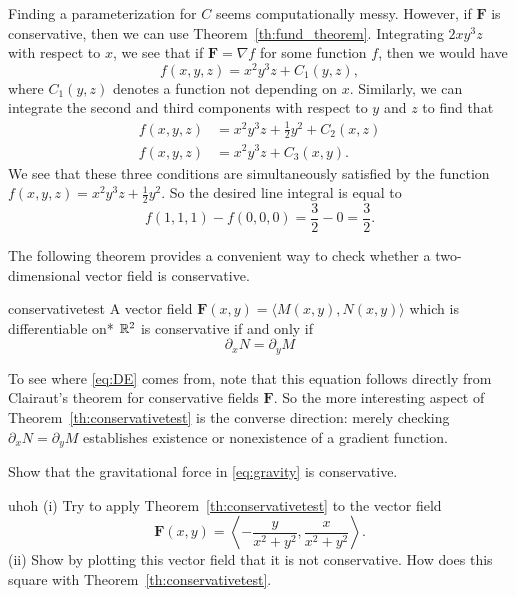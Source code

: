 \documentclass{watsonbook}
\begin{document}
\begin{solution}
  Finding a parameterization for $C$ seems computationally messy.
  However, if $\mathbf{F}$ is conservative, then we can use
  Theorem~\ref{th:fund_theorem}. Integrating $2  x y^{3} z$ with
  respect to $x$, we see that if $\mathbf{F} = \nabla f$ for some
  function $f$, then we would have 
  \[
    f(x,y,z) = x^2 y^3 z + C_1(y,z), 
  \]
  where $C_1(y,z)$ denotes a function not depending on $x$. Similarly,
  we can integrate the second and third components with respect to $y$
  and $z$ to find that
  \begin{align*}
    f(x,y,z) &= x^2 y^3 z + \frac{1}{2}y^2 + C_2(x,z) \\
    f(x,y,z) &= x^2 y^3 z + C_3(x,y). 
  \end{align*}
  We see that these three conditions are simultaneously satisfied by
  the function $f(x,y,z) = x^2 y^3 z + \tfrac{1}{2}y^2$. So the
  desired line integral is equal to 
  \[
    f(1,1,1) - f(0,0,0) = \frac{3}{2} - 0  = \boxed{\frac{3}{2}}. 
  \]
\end{solution}

The following theorem provides a convenient way to check whether a
two-dimensional vector field is conservative. 

\begin{theo}{}{conservativetest}
  A vector field $\mathbf{F}(x,y) = \langle M(x,y), N(x,y)\rangle$
  which is differentiable on*  $\mathbb{R}^2$ is
  conservative if and only if
  \begin{equation} \label{eq:DE}
    \partial_x N = \partial_y M
  \end{equation}
\end{theo}
To see where \eqref{eq:DE} comes from, note that this equation follows directly
from Clairaut's theorem for conservative fields $\mathbf{F}$. 
So the more interesting aspect of Theorem~\ref{th:conservativetest} is
the converse direction: merely checking $\partial_x N = \partial_y M$
establishes existence or nonexistence of a gradient function. 

\begin{exercise}{}{}
  Show that the gravitational force in \eqref{eq:gravity} is
  conservative.
\end{exercise}

\begin{exercise}{}{uhoh}
  (i) Try to apply Theorem~\ref{th:conservativetest}  to the vector
  field
  \[
    \mathbf{F}(x,y) = \left\langle
      -\frac{y}{{x^2+y^2}},
      \frac{x}{{x^2+y^2}}
    \right\rangle. 
  \]  
  (ii) Show by plotting this vector field that it is not
  conservative. How does this square with
  Theorem~\ref{th:conservativetest}.
\end{exercise}
\end{document}
